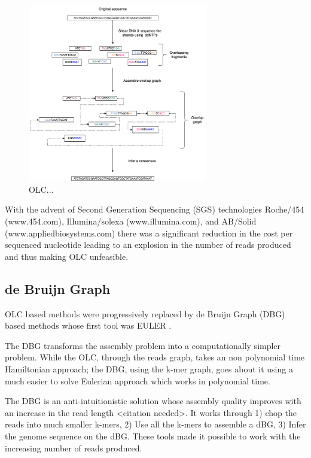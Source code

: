 \documentclass[11pt]{article}
\begin{document}
\begin{figure}[H]
\centering
\includegraphics[width=0.7\textwidth]{figures/OLC framework.png}
\caption{OLC...}
\end{figure}

With the advent of Second Generation Sequencing (SGS) technologies 
Roche/454 (www.454.com), Illumina/solexa (www.illumina.com),
and AB/Solid (www.appliedbiosystems.com) there was a significant reduction in 
the cost per sequenced nucleotide \cite{liComparisonTwoMajor2012} leading to an 
explosion in the number of reads produced and thus making OLC unfeasible. 

\subsection{de Bruijn Graph}
\label{sec:org5eb2447}
OLC based methods were progressively replaced by de Bruijn Graph (DBG)
\cite{iduryNewAlgorithmDNA1995} based methods whose first tool was EULER
\cite{pevznerEulerianPathApproach2001}.

The DBG transforms the assembly problem into a computationally simpler problem.
While the OLC, through the reads graph, takes an non polynomial time Hamiltonian 
approach; the DBG, using the k-mer graph, goes about it using a much easier to
solve Eulerian approach which works in polynomial time.
\cite{liComparisonTwoMajor2012,pevznerEulerianPathApproach2001} 

The DBG is an anti-intuitionistic solution whose assembly quality improves with 
an increase in the read length <citation needed>. It works through 1) chop the reads into
much smaller k-mers, 2) Use all the k-mers to assemble a dBG, 3) Infer the 
genome sequence on the dBG. These tools made it possible to work with the 
increasing number of reads produced. 
\end{document}
